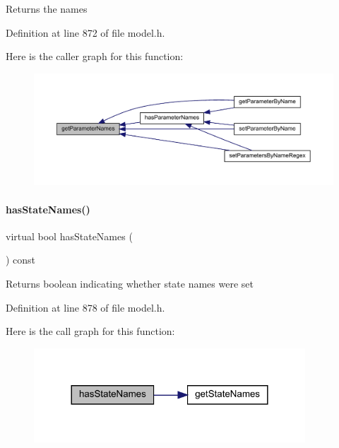 \begin{DoxyReturn}{Returns}
the names 
\end{DoxyReturn}


Definition at line 872 of file model.\+h.

Here is the caller graph for this function\+:
\nopagebreak
\begin{figure}[H]
\begin{center}
\leavevmode
\includegraphics[width=350pt]{classamici_1_1_model_a7bc0cf1cdd032486ba923fc1d9678262_icgraph}
\end{center}
\end{figure}
\mbox{\label{classamici_1_1_model_a219d9d04b7eeed20cf4ba36536cd0a4c}} 
\paragraph{\texorpdfstring{has\+State\+Names()}{hasStateNames()}}
{\footnotesize\ttfamily virtual bool has\+State\+Names (\begin{DoxyParamCaption}{ }\end{DoxyParamCaption}) const\hspace{0.3cm}{\ttfamily [virtual]}}

\begin{DoxyReturn}{Returns}
boolean indicating whether state names were set 
\end{DoxyReturn}


Definition at line 878 of file model.\+h.

Here is the call graph for this function\+:
\nopagebreak
\begin{figure}[H]
\begin{center}
\leavevmode
\includegraphics[width=288pt]{classamici_1_1_model_a219d9d04b7eeed20cf4ba36536cd0a4c_cgraph}
\end{center}
\end{figure}
\mbox{\label{classamici_1_1_model_a1c55f5cf94db51bb2bbb26d4c425eb0a}} 
